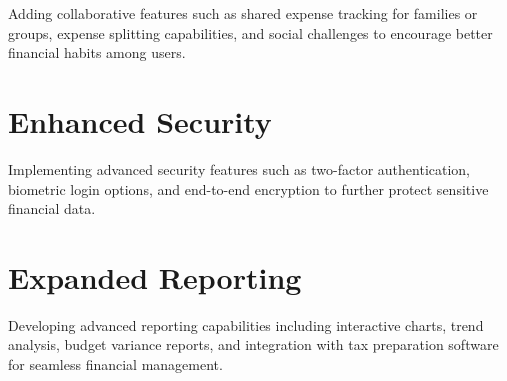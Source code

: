 Adding collaborative features such as shared expense tracking for families or groups, expense splitting capabilities, and social challenges to encourage better financial habits among users.

\section{Enhanced Security}

Implementing advanced security features such as two-factor authentication, biometric login options, and end-to-end encryption to further protect sensitive financial data.

\section{Expanded Reporting}

Developing advanced reporting capabilities including interactive charts, trend analysis, budget variance reports, and integration with tax preparation software for seamless financial management.